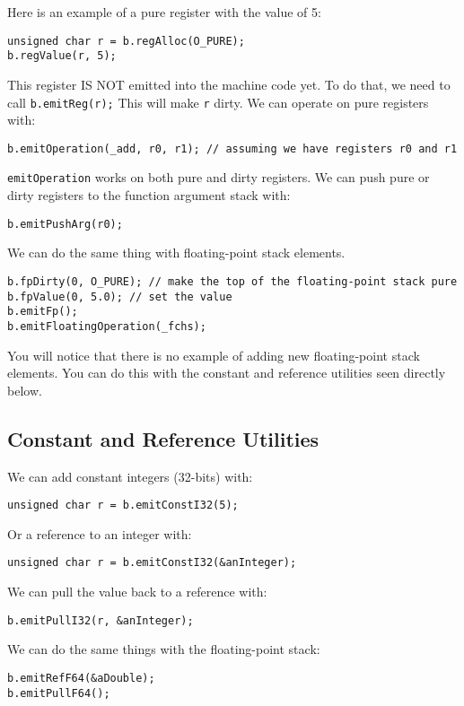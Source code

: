 \documentclass[10pt,a4paper]{article}
\begin{document}
Here is an example of a pure register with the value of 5:
\begin{verbatim}
unsigned char r = b.regAlloc(O_PURE);
b.regValue(r, 5);
\end{verbatim}

This register IS NOT emitted into the machine code yet. To do that, we need to call \verb|b.emitReg(r);| This will make \verb|r| dirty. We can operate on pure registers with:
\begin{verbatim}
b.emitOperation(_add, r0, r1); // assuming we have registers r0 and r1
\end{verbatim}

\verb|emitOperation| works on both pure and dirty registers. We can push pure or dirty registers to the function argument stack with:
\begin{verbatim}
b.emitPushArg(r0);
\end{verbatim}

We can do the same thing with floating-point stack elements.
\begin{verbatim}
b.fpDirty(0, O_PURE); // make the top of the floating-point stack pure
b.fpValue(0, 5.0); // set the value
b.emitFp();
b.emitFloatingOperation(_fchs);
\end{verbatim}

You will notice that there is no example of adding new floating-point stack elements. You can do this with the constant and reference utilities seen directly below.

\subsection{Constant and Reference Utilities}
We can add constant integers (32-bits) with:
\begin{verbatim}
unsigned char r = b.emitConstI32(5);
\end{verbatim}

Or a reference to an integer with:
\begin{verbatim}
unsigned char r = b.emitConstI32(&anInteger);
\end{verbatim}

We can pull the value back to a reference with:
\begin{verbatim}
b.emitPullI32(r, &anInteger);
\end{verbatim}

We can do the same things with the floating-point stack:
\begin{verbatim}
b.emitRefF64(&aDouble);
b.emitPullF64();
\end{verbatim}
\end{document}
